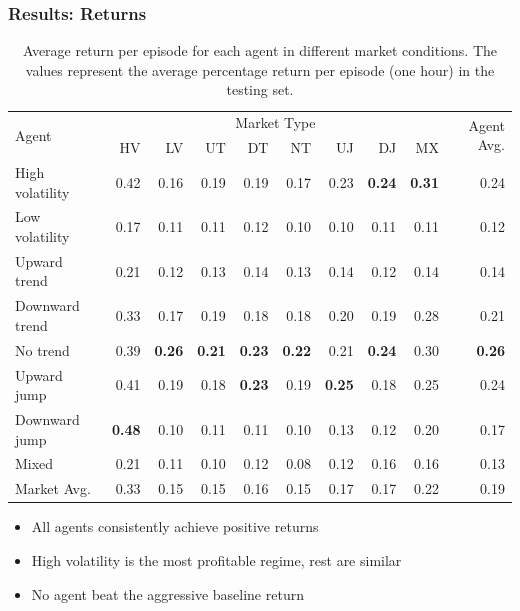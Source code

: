 \documentclass{beamer}
\begin{document}
\begin{frame}
  \frametitle{Results: Returns}

  \begin{table}[htbp]
    \fontsize{7}{9}\selectfont
    \centering
    \caption{Average return per episode for each agent in different market conditions. The values represent the average percentage return per episode (one hour) in the testing set.}
    \begin{tabular}{l|rrrrrrrr|r}
    \hline
    \multirow{2}{*}{Agent} & \multicolumn{8}{c|}{Market Type} & \multirow{2}{*}{Agent Avg.} \\
    \cline{2-9}
    & HV &  LV &  UT &  DT &  NT &  UJ &  DJ & MX \\
    \hline
    High volatility &      0.42 &     0.16 &      0.19 &        0.19 &      0.17 &     0.23 &       \textbf{0.24} &   \textbf{0.31} &        0.24 \\
    Low volatility  &      0.17 &     0.11 &      0.11 &        0.12 &      0.10 &     0.10 &       0.11 &   0.11 &        0.12 \\
    Upward trend    &      0.21 &     0.12 &      0.13 &        0.14 &      0.13 &     0.14 &       0.12 &   0.14 &        0.14 \\
    Downward trend  &      0.33 &     0.17 &      0.19 &        0.18 &      0.18 &     0.20 &       0.19 &   0.28 &        0.21 \\
    No trend        &      0.39 &     \textbf{0.26} &      \textbf{0.21} &        \textbf{0.23} &      \textbf{0.22} &     0.21 &       \textbf{0.24} &   0.30 &        \textbf{0.26} \\
    Upward jump     &      0.41 &     0.19 &      0.18 &        \textbf{0.23} &      0.19 &     \textbf{0.25} &       0.18 &   0.25 &        0.24 \\
    Downward jump   &      \textbf{0.48} &     0.10 &      0.11 &        0.11 &      0.10 &     0.13 &       0.12 &   0.20 &        0.17 \\
    Mixed           &      0.21 &     0.11 &      0.10 &        0.12 &      0.08 &     0.12 &       0.16 &   0.16 &        0.13 \\
    \hline
    Market Avg.     &      0.33 &     0.15 &      0.15 &        0.16 &      0.15 &     0.17 &       0.17 &   0.22 &        0.19 \\
    \end{tabular}
  \end{table}

  \begin{itemize}
    \item All agents consistently achieve positive returns
    \item High volatility is the most profitable regime, rest are similar
    \item No agent beat the aggressive baseline return
  \end{itemize}
  
\end{frame}
\end{document}
